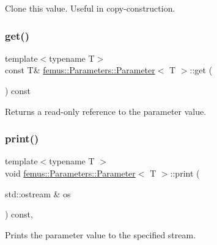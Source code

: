 Clone this value. Useful in copy-\/construction. \mbox{\label{classfemus_1_1_parameters_1_1_parameter_ae8604847b5ed45edc3289a64e2639c8a}} 
\subsubsection{\texorpdfstring{get()}{get()}}
{\footnotesize\ttfamily template$<$typename T$>$ \\
const T\& \mbox{\hyperlink{classfemus_1_1_parameters_1_1_parameter}{femus\+::\+Parameters\+::\+Parameter}}$<$ T $>$\+::get (\begin{DoxyParamCaption}{ }\end{DoxyParamCaption}) const\hspace{0.3cm}{\ttfamily [inline]}}

\begin{DoxyReturn}{Returns}
a read-\/only reference to the parameter value. 
\end{DoxyReturn}
\mbox{\label{classfemus_1_1_parameters_1_1_parameter_aecc1e861889ad36033fd905c30e5b70c}} 
\subsubsection{\texorpdfstring{print()}{print()}}
{\footnotesize\ttfamily template$<$typename T $>$ \\
void \mbox{\hyperlink{classfemus_1_1_parameters_1_1_parameter}{femus\+::\+Parameters\+::\+Parameter}}$<$ T $>$\+::print (\begin{DoxyParamCaption}\item[{std\+::ostream \&}]{os }\end{DoxyParamCaption}) const\hspace{0.3cm}{\ttfamily [inline]}, {\ttfamily [virtual]}}

Prints the parameter value to the specified stream. \mbox{\label{classfemus_1_1_parameters_1_1_parameter_a8fe5abea9c4f01d039cf18a96f710bb5}} 
